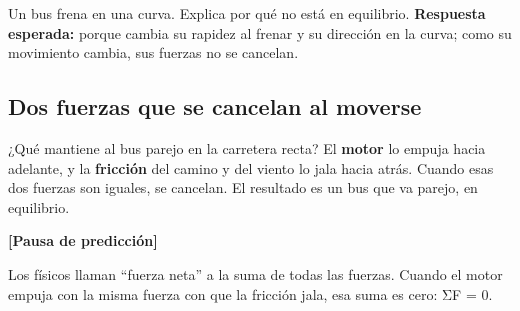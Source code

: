 \documentclass[
  spanish,
  letterpaper,
  12pt,
  oneside,
  open=any,
  DIV=15]{scrbook}
\begin{document}
\begin{tcolorbox}[enhanced jigsaw, arc=.35mm, bottomrule=.15mm, bottomtitle=1mm, breakable, colback=white, colbacktitle=quarto-callout-tip-color!10!white, colframe=quarto-callout-tip-color-frame, coltitle=black, left=2mm, leftrule=.75mm, opacityback=0, opacitybacktitle=0.6, rightrule=.15mm, title=\textcolor{quarto-callout-tip-color}{\faLightbulb}\hspace{0.5em}{Apoyo Procedimental (Comprobación)}, titlerule=0mm, toprule=.15mm, toptitle=1mm]

Un bus frena en una curva. Explica por qué no está en equilibrio.
\textbf{Respuesta esperada:} porque cambia su rapidez al frenar y su
dirección en la curva; como su movimiento cambia, sus fuerzas no se
cancelan.

\end{tcolorbox}

\subsection{Dos fuerzas que se cancelan al
moverse}\label{dos-fuerzas-que-se-cancelan-al-moverse}

¿Qué mantiene al bus parejo en la carretera recta? El
\textcolor[HTML]{7C3AED}{\textbf{motor}} lo empuja hacia adelante, y la
\textcolor[HTML]{2563EB}{\textbf{fricción}} del camino y del viento lo
jala hacia atrás. Cuando esas dos fuerzas son iguales, se cancelan. El
resultado es un bus que va parejo, en equilibrio.

\textbf{{[}Pausa de predicción{]}}

\begin{tcolorbox}[enhanced jigsaw, arc=.35mm, bottomrule=.15mm, bottomtitle=1mm, breakable, colback=white, colbacktitle=quarto-callout-tip-color!10!white, colframe=quarto-callout-tip-color-frame, coltitle=black, left=2mm, leftrule=.75mm, opacityback=0, opacitybacktitle=0.6, rightrule=.15mm, title=\textcolor{quarto-callout-tip-color}{\faLightbulb}\hspace{0.5em}{Apoyo Procedimental (Forma técnica)}, titlerule=0mm, toprule=.15mm, toptitle=1mm]

Los físicos llaman ``fuerza neta'' a la suma de todas las fuerzas.
Cuando el \textcolor[HTML]{7C3AED}{motor} empuja con la misma fuerza con
que la \textcolor[HTML]{2563EB}{fricción} jala, esa suma es cero: ΣF =
0.

\end{tcolorbox}
\end{document}
